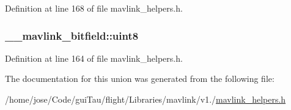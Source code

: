 Definition at line 168 of file mavlink\-\_\-helpers.\-h.

\hypertarget{union____mavlink__bitfield_ade669a5f63c53f0d61f636eff94417c0}{
\subsubsection[{uint8}]{ \-\_\-\-\_\-mavlink\-\_\-bitfield\-::uint8}}\label{union____mavlink__bitfield_ade669a5f63c53f0d61f636eff94417c0}


Definition at line 164 of file mavlink\-\_\-helpers.\-h.



The documentation for this union was generated from the following file\-:\begin{DoxyCompactItemize}
\item 
/home/jose/\-Code/gui\-Tau/flight/\-Libraries/mavlink/v1./\hyperlink{mavlink__helpers_8h}{mavlink\-\_\-helpers.\-h}\end{DoxyCompactItemize}
